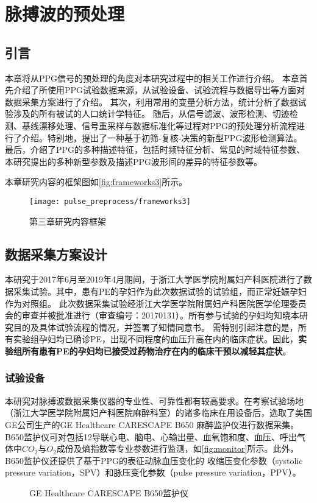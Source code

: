 \chapter{脉搏波的预处理}
\section{引言}
本章将从PPG信号的预处理的角度对本研究过程中的相关工作进行介绍。
本章首先介绍了所使用PPG试验数据来源，从试验设备、试验流程与数据导出等方面对数据采集方案进行了介绍。
其次，利用常用的变量分析方法，统计分析了数据试验涉及的所有被试的人口统计学特征。
随后，从信号滤波、波形检测、切迹检测、基线漂移处理、信号重采样与数据标准化等过程对PPG的预处理分析流程进行了介绍。特别地，提出了一种基于初筛-复核-决策的新型PPG波形检测算法。
最后，介绍了PPG的多种描述特征，包括时频特征分析、常见的时域特征参数、本研究提出的多种新型参数及描述PPG波形间的差异的特征参数等。

本章研究内容的框架图如\autoref{fig:frameworks3}所示。

\begin{figure}[htbp]
    \centering
    \texttt{[image: pulse\_preprocess/frameworks3]}
    \caption{\label{fig:frameworks3}第三章研究内容框架}
\end{figure}
\section{数据采集方案设计}
本研究于2017年6月至2019年4月期间，于浙江大学医学院附属妇产科医院进行了数据采集试验。其中，患有PE的孕妇作为此次数据试验的试验组，而正常妊娠孕妇作为对照组。
此次数据采集试验经浙江大学医学院附属妇产科医院医学伦理委员会的审查并被批准进行（审查编号：20170131）。所有参与试验的孕妇均知晓本研究目的及具体试验流程的情况，并签署了知情同意书。
需特别引起注意的是，所有实验组孕妇均已确诊PE，出现不同程度的血压升高在内的临床症状。因此，\textbf{实验组所有患有PE的孕妇均已接受过药物治疗在内的临床干预以减轻其症状}。
\subsection{试验设备}
本研究对脉搏波数据采集仪器的专业性、可靠性都有较高要求。在考察试验场地（浙江大学医学院附属妇产科医院麻醉科室）的诸多临床在用设备后，选取了美国GE公司生产的GE Healthcare CARESCAPE B650 麻醉监护仪进行数据采集。
B650监护仪可对包括12导联心电、脑电、心输出量、血氧饱和度、血压、呼出气体中$CO_{2}$与$O_{2}$成份及熵指数等专业参数进行监测，如\autoref{fig:monitor}所示。此外，B650监护仪还提供了基于PPG的表征动脉血压变化的
收缩压变化参数（systolic pressure variation，SPV）和脉压变化参数（pulse pressure variation，PPV）\cite{GE2021,Michard1999}。
\begin{figure}[htbp]
    \centering
    \quad
    \caption{\label{fig:monitor}GE Healthcare CARESCAPE B650监护仪}
\end{figure}


